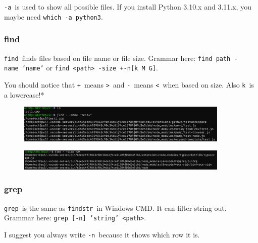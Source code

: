 \documentclass[12pt]{ctexart}
\newenvironment{mdquote}
{%
  \par\noindent
  \begin{list}{}{%
      \setlength{\leftmargin}{1em}%
      \setlength{\rightmargin}{0pt}%
      \setlength{\itemindent}{0pt}%
      \setlength{\listparindent}{\parindent}%
      \setlength{\topsep}{0.5\baselineskip}%
  }
  \item[\textbf{>}\ ]\itshape
}
{\end{list}\par}
\begin{document}
\texttt{-a}\ is used to show all possible files. If you install Python
3.10.x and 3.11.x, you maybe need \texttt{which\ -a\ python3}.

\subsubsection{\textbf{find}}

\texttt{find}\ finds files based on file name or file size. Grammar here:
\texttt{find\ path\ -name\ 'name'} or
\texttt{find\ \textless{}path\textgreater{}\ -size\ +\textbar{}-n{[}k\ M\ G{]}}.


\begin{mdquote}
You should notice that \texttt{+}\ means \texttt{\textgreater{}}\ and
\texttt{-}\ means \texttt{\textless{}}\ when based on size. Also
\texttt{k}\ is a lowercase!*

\begin{figure}[H]
    \centering
    \includegraphics[width=0.9\textwidth,keepaspectratio]{assets/Linux/1.5 Linux file commands/8.png}
\end{figure}

\begin{figure}[H]
    \centering
    \includegraphics[width=0.9\textwidth,keepaspectratio]{assets/Linux/1.5 Linux file commands/9.png}
\end{figure}
\end{mdquote}

\subsubsection{\textbf{grep}}

\texttt{grep}\ is the same as \texttt{findstr}\ in Windows CMD. It can
filter string out. Grammar here:
\texttt{grep\ {[}-n{]}\ 'string'\ \textless{}path\textgreater{}}.

\begin{mdquote}
I suggest you always write \texttt{-n}\ because it shows which row it is.
\end{mdquote}
\end{document}
